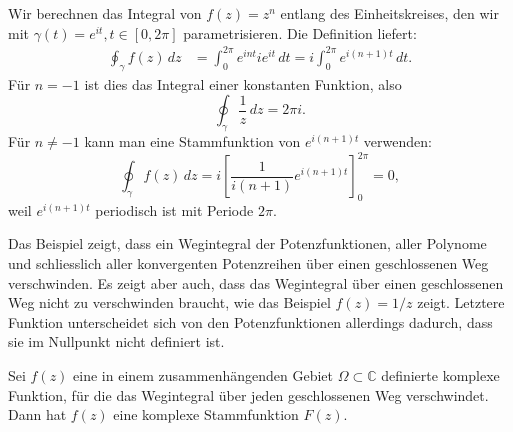 \begin{beispiel}
Wir berechnen das Integral von $f(z)=z^n$ entlang des Einheitskreises,
den wir mit $\gamma(t)=e^{it},t\in[0,2\pi]$ parametrisieren.
Die Definition liefert:
\begin{align*}
\oint_{\gamma}f(z)\,dz
&=
\int_0^{2\pi}e^{int}ie^{it}\,dt
=
i\int_0^{2\pi}e^{i(n+1)t}\,dt.
\end{align*}
Für $n=-1$ ist dies das Integral einer konstanten Funktion, also
\[
\oint_{\gamma}\frac1z\,dz=2\pi i.
\]
Für $n\ne -1$ kann man eine Stammfunktion von $e^{i(n+1)t}$
verwenden:
\[
\oint_{\gamma}f(z)\,dz
=
i\left[\frac1{i(n+1)}e^{i(n+1)t}\right]_0^{2\pi}
=0,
\]
weil $e^{i(n+1)t}$ periodisch ist mit Periode $2\pi$.
\end{beispiel}
Das Beispiel zeigt, dass ein Wegintegral der Potenzfunktionen,
aller Polynome und schliesslich aller konvergenten Potenzreihen
über einen geschlossenen Weg verschwinden.
Es zeigt aber auch, dass das Wegintegral über einen geschlossenen
Weg nicht zu verschwinden braucht, wie das Beispiel $f(z)=1/z$
zeigt.
Letztere Funktion unterscheidet sich von den Potenzfunktionen allerdings
dadurch, dass sie im Nullpunkt nicht definiert ist.

\begin{satz}
Sei $f(z)$ eine in einem zusammenhängenden Gebiet $\Omega\subset\mathbb C$
definierte komplexe Funktion, für die das Wegintegral über jeden
geschlossenen Weg verschwindet.
Dann hat $f(z)$ eine komplexe Stammfunktion $F(z)$.
\end{satz}

